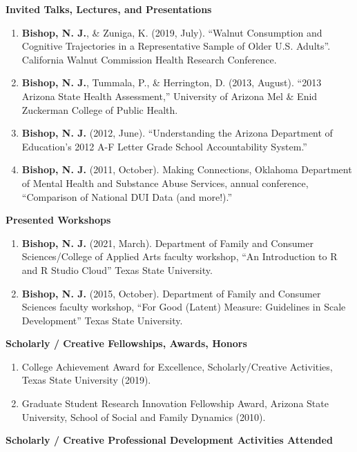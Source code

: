 \documentclass[
]{article}
\begin{document}
\textbf{Invited Talks, Lectures, and Presentations}

\begin{enumerate}
\def\labelenumi{\arabic{enumi}.}
\item
  \textbf{Bishop, N. J.}, \& Zuniga, K. (2019, July). ``Walnut
  Consumption and Cognitive Trajectories in a Representative Sample of
  Older U.S. Adults''. California Walnut Commission Health Research
  Conference.
\item
  \textbf{Bishop, N. J.}, Tummala, P., \& Herrington, D. (2013, August).
  ``2013 Arizona State Health Assessment,'' University of Arizona Mel \&
  Enid Zuckerman College of Public Health.
\item
  \textbf{Bishop, N. J.} (2012, June). ``Understanding the Arizona
  Department of Education's 2012 A-F Letter Grade School Accountability
  System.''
\item
  \textbf{Bishop, N. J.} (2011, October). Making Connections, Oklahoma
  Department of Mental Health and Substance Abuse Services, annual
  conference, ``Comparison of National DUI Data (and more!).''
\end{enumerate}

\textbf{Presented Workshops}

\begin{enumerate}
\def\labelenumi{\arabic{enumi}.}
\item
  \textbf{Bishop, N. J.} (2021, March). Department of Family and
  Consumer Sciences/College of Applied Arts faculty workshop, ``An
  Introduction to R and R Studio Cloud'' Texas State University.
\item
  \textbf{Bishop, N. J.} (2015, October). Department of Family and
  Consumer Sciences faculty workshop, ``For Good (Latent) Measure:
  Guidelines in Scale Development'' Texas State University.
\end{enumerate}

\textbf{Scholarly / Creative Fellowships, Awards, Honors}

\begin{enumerate}
\def\labelenumi{\arabic{enumi}.}
\item
  College Achievement Award for Excellence, Scholarly/Creative
  Activities, Texas State University (2019).
\item
  Graduate Student Research Innovation Fellowship Award, Arizona State
  University, School of Social and Family Dynamics (2010).
\end{enumerate}

\textbf{Scholarly / Creative Professional Development Activities
Attended}
\end{document}
